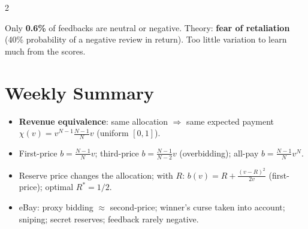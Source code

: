 \documentclass[a4paper,9pt]{extarticle}
\begin{document}
\begin{multicols}{2}
\begin{itemize}
\end{itemize}


\begin{warning}

Only \textbf{0.6\%} of feedbacks are neutral or negative. Theory: \textbf{fear of
retaliation} (40\% probability of a negative review in return). Too little variation to learn
much from the scores.

\end{warning}



\section{Weekly Summary}


\begin{summary}

\begin{itemize}

\item \textbf{Revenue equivalence}: same allocation $\Rightarrow$ same expected payment
$\chi(v) = v^{N-1}\frac{N-1}{N}v$ (uniform $[0,1]$).

\item First-price $b = \frac{N-1}{N}v$; third-price $b = \frac{N-1}{N-2}v$ (overbidding);
all-pay $b = \frac{N-1}{N}v^N$.

\item Reserve price changes the allocation; with $R$: $b(v) = R + \frac{(v-R)^2}{2v}$
(first-price); optimal $R^* = 1/2$.

\item eBay: proxy bidding $\approx$ second-price; winner's curse taken into account; sniping;
secret reserves; feedback rarely negative.

\end{itemize}

\end{summary}



\end{multicols}
\end{document}
